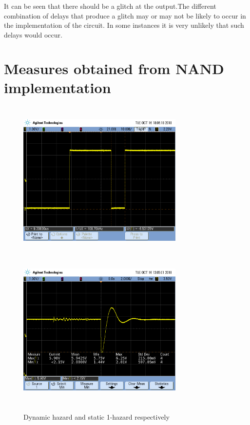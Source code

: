 It can be seen that there should be a glitch at the output.The different combination of delays that produce a glitch may or may not be likely 
to occur in the implementation of the circuit. In some instances it is very 
unlikely that such delays would occur.


\section*{Measures obtained from NAND implementation}
\begin{figure}[H] 
\begin{center}
\includegraphics[width=8.25cm,height=8cm]{data/000to001.png}
\includegraphics[width=8.25cm,height=8cm]{data/001to011.png}
\end{center}
\caption{Dynamic hazard and static 1-hazard respectively}
\label{fig:measures}
\end{figure} 

